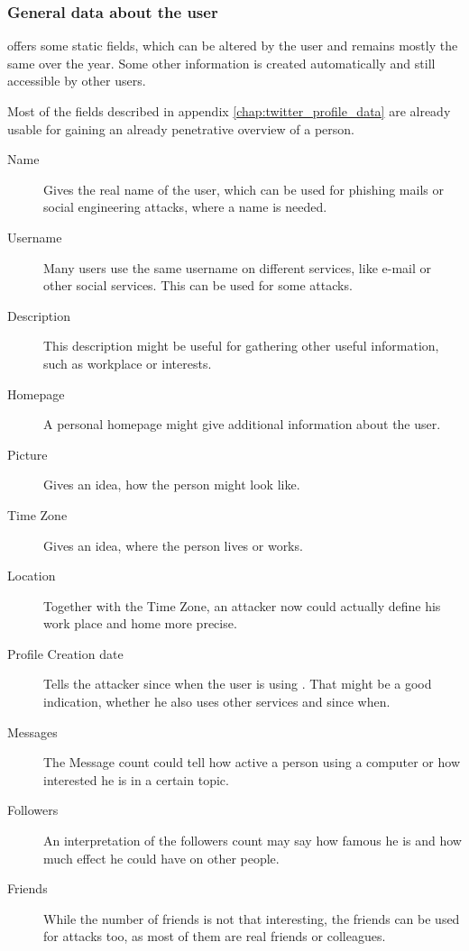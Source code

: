 \subsubsection{General data about the user}
\label{sssec:general_data}
\Twitter{} offers some static fields, which can be altered by the user and
remains mostly the same over the year. Some other information is created
automatically and still accessible by other users.

Most of the fields described in appendix \ref{chap:twitter_profile_data} are
already usable for gaining an already penetrative overview of a person.

\begin{description}
\item[Name] Gives the real name of the user, which can be used for
phishing mails or social engineering attacks, where a name is needed.

\item[Username] Many users use the same username on different
services, like e-mail or other social services. This can be used for some
attacks.

\item[Description] This description might be useful for gathering other useful
information, such as workplace or interests.

\item[Homepage] A personal homepage might give additional
information about the user.

\item[Picture] Gives an idea, how the person might
look like.

\item[Time Zone] Gives an idea, where the person
lives or works.

\item[Location] Together with the Time Zone, an attacker now
could actually define his work place and home more precise.

\item[Profile Creation date] Tells the attacker
since when the user is using \Twitter{}. That might be a good indication,
whether he also uses other services and since when.

\item[Messages] The Message count could tell how active a person using a
computer or how interested he is in a certain topic.

\item[Followers] An interpretation of the followers count may say how
famous he is and how much effect he could have on other people.

\item[Friends] While the number of friends is not that interesting,
the friends can be used for attacks too, as most of them are real friends
or colleagues.
\end{description}

